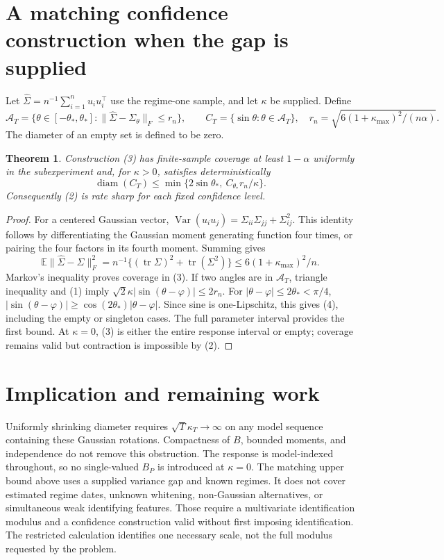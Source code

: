 \documentclass[11pt]{article}
\newtheorem{theorem}{Theorem}
\theoremstyle{definition}
\begin{document}
\section*{A matching confidence construction when the gap is supplied}
Let $\widehat\Sigma=n^{-1}\sum_{i=1}^n u_i u_i^\top$ use the regime-one
sample, and let $\kappa$ be supplied. Define
\[
 \mathcal A_T=\{\theta\in[-\theta_*,\theta_*]:
             \|\widehat\Sigma-\Sigma_\theta\|_F\le r_n\},\qquad
 C_T=\{\sin\theta:\theta\in\mathcal A_T\},\quad
 r_n=\sqrt{6(1+\kappa_{\max})^2/(n\alpha)}.             \tag{3}
\]
The diameter of an empty set is defined to be zero.
\begin{theorem}
Construction (3) has finite-sample coverage at least $1-\alpha$ uniformly
in the subexperiment and, for $\kappa>0$, satisfies deterministically
\[
 \operatorname{diam}(C_T)
 \le\min\{2\sin\theta_*,\ C_{\theta_*}r_n/\kappa\}.     \tag{4}
\]
Consequently (2) is rate sharp for each fixed confidence level.
\end{theorem}
\begin{proof}
For a centered Gaussian vector,
$\operatorname{Var}(u_i u_j)=\Sigma_{ii}\Sigma_{jj}+\Sigma_{ij}^2$.
This identity follows by differentiating the Gaussian moment generating
function four times, or pairing the four factors in its fourth moment.
Summing gives
\[
 \mathbb E\|\widehat\Sigma-\Sigma\|_F^2
 =n^{-1}\{(\operatorname{tr}\Sigma)^2+\operatorname{tr}(\Sigma^2)\}
 \le6(1+\kappa_{\max})^2/n.
\]
Markov's inequality proves coverage in (3).
If two angles are in $\mathcal A_T$, triangle inequality and (1) imply
$\sqrt2\kappa|\sin(\theta-\varphi)|\le2r_n$.
For $|\theta-\varphi|\le2\theta_*<\pi/4$,
$|\sin(\theta-\varphi)|\ge\cos(2\theta_*)|\theta-\varphi|$.
Since sine is one-Lipschitz, this gives (4), including the empty or
singleton cases. The full parameter interval provides the first bound.
At $\kappa=0$, (3) is either the entire response interval or empty;
coverage remains valid but contraction is impossible by (2).
\end{proof}

\section*{Implication and remaining work}
Uniformly shrinking diameter requires $\sqrt T\kappa_T\to\infty$
on any model sequence containing these Gaussian rotations. Compactness of
$B$, bounded moments, and independence do not remove this obstruction.
The response is model-indexed throughout, so no single-valued $B_P$ is
introduced at $\kappa=0$.
The matching upper bound above uses a supplied variance gap and known
regimes. It does not cover estimated regime dates, unknown whitening,
non-Gaussian alternatives, or simultaneous weak identifying features.
Those require a multivariate identification modulus and a confidence
construction valid without first imposing identification. The restricted
calculation identifies one necessary scale, not the full modulus requested
by the problem.
\end{document}
